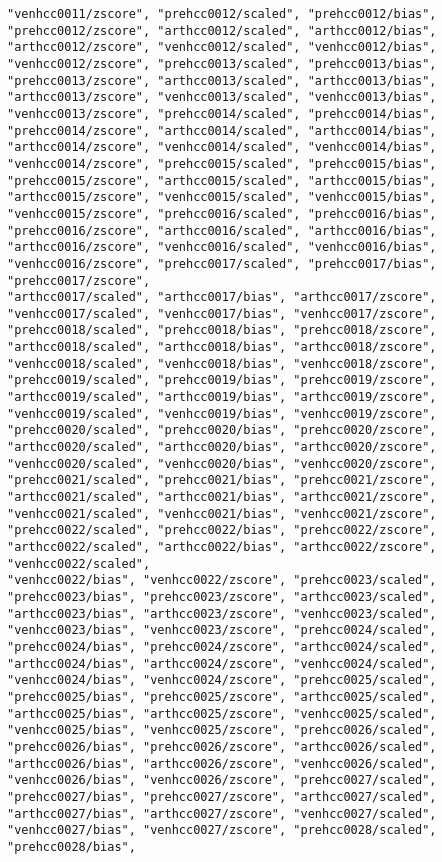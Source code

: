 \documentclass{article}         %
\theoremstyle{definition}
\theoremstyle{remark}
\begin{document}
\begin{verbatim}
"venhcc0011/zscore", "prehcc0012/scaled", "prehcc0012/bias", "prehcc0012/zscore", "arthcc0012/scaled", "arthcc0012/bias", "arthcc0012/zscore", "venhcc0012/scaled", "venhcc0012/bias", "venhcc0012/zscore", "prehcc0013/scaled", "prehcc0013/bias", "prehcc0013/zscore", "arthcc0013/scaled", "arthcc0013/bias", "arthcc0013/zscore", "venhcc0013/scaled", "venhcc0013/bias", "venhcc0013/zscore", "prehcc0014/scaled", "prehcc0014/bias", "prehcc0014/zscore", "arthcc0014/scaled", "arthcc0014/bias", "arthcc0014/zscore", "venhcc0014/scaled", "venhcc0014/bias", "venhcc0014/zscore", "prehcc0015/scaled", "prehcc0015/bias", "prehcc0015/zscore", "arthcc0015/scaled", "arthcc0015/bias", "arthcc0015/zscore", "venhcc0015/scaled", "venhcc0015/bias", "venhcc0015/zscore", "prehcc0016/scaled", "prehcc0016/bias", "prehcc0016/zscore", "arthcc0016/scaled", "arthcc0016/bias", "arthcc0016/zscore", "venhcc0016/scaled", "venhcc0016/bias", "venhcc0016/zscore", "prehcc0017/scaled", "prehcc0017/bias", "prehcc0017/zscore",
"arthcc0017/scaled", "arthcc0017/bias", "arthcc0017/zscore", "venhcc0017/scaled", "venhcc0017/bias", "venhcc0017/zscore", "prehcc0018/scaled", "prehcc0018/bias", "prehcc0018/zscore", "arthcc0018/scaled", "arthcc0018/bias", "arthcc0018/zscore", "venhcc0018/scaled", "venhcc0018/bias", "venhcc0018/zscore", "prehcc0019/scaled", "prehcc0019/bias", "prehcc0019/zscore", "arthcc0019/scaled", "arthcc0019/bias", "arthcc0019/zscore", "venhcc0019/scaled", "venhcc0019/bias", "venhcc0019/zscore", "prehcc0020/scaled", "prehcc0020/bias", "prehcc0020/zscore", "arthcc0020/scaled", "arthcc0020/bias", "arthcc0020/zscore", "venhcc0020/scaled", "venhcc0020/bias", "venhcc0020/zscore", "prehcc0021/scaled", "prehcc0021/bias", "prehcc0021/zscore", "arthcc0021/scaled", "arthcc0021/bias", "arthcc0021/zscore", "venhcc0021/scaled", "venhcc0021/bias", "venhcc0021/zscore", "prehcc0022/scaled", "prehcc0022/bias", "prehcc0022/zscore", "arthcc0022/scaled", "arthcc0022/bias", "arthcc0022/zscore", "venhcc0022/scaled",
"venhcc0022/bias", "venhcc0022/zscore", "prehcc0023/scaled", "prehcc0023/bias", "prehcc0023/zscore", "arthcc0023/scaled", "arthcc0023/bias", "arthcc0023/zscore", "venhcc0023/scaled", "venhcc0023/bias", "venhcc0023/zscore", "prehcc0024/scaled", "prehcc0024/bias", "prehcc0024/zscore", "arthcc0024/scaled", "arthcc0024/bias", "arthcc0024/zscore", "venhcc0024/scaled", "venhcc0024/bias", "venhcc0024/zscore", "prehcc0025/scaled", "prehcc0025/bias", "prehcc0025/zscore", "arthcc0025/scaled", "arthcc0025/bias", "arthcc0025/zscore", "venhcc0025/scaled", "venhcc0025/bias", "venhcc0025/zscore", "prehcc0026/scaled", "prehcc0026/bias", "prehcc0026/zscore", "arthcc0026/scaled", "arthcc0026/bias", "arthcc0026/zscore", "venhcc0026/scaled", "venhcc0026/bias", "venhcc0026/zscore", "prehcc0027/scaled", "prehcc0027/bias", "prehcc0027/zscore", "arthcc0027/scaled", "arthcc0027/bias", "arthcc0027/zscore", "venhcc0027/scaled", "venhcc0027/bias", "venhcc0027/zscore", "prehcc0028/scaled", "prehcc0028/bias",

\end{verbatim}
\end{document}

